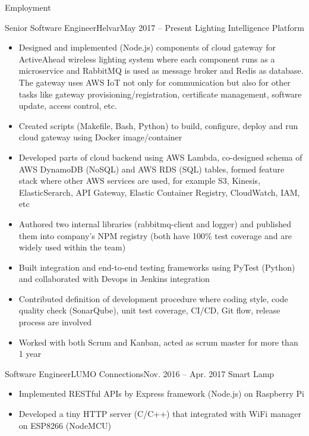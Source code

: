 \documentclass[print]{mcdowellcv}
\begin{document}
	\begin{cvsection}{Employment}
		\begin{cvsubsection}{Senior Software Engineer}{Helvar}{May 2017 -- Present}
			Lighting Intelligence Platform
			\begin{itemize}
			    \item Designed and implemented (Node.js) components of cloud gateway for ActiveAhead wireless lighting system where each component runs as a microservice and RabbitMQ is used as message broker and Redis as database. The gateway uses AWS IoT not only for communication but also for other tasks like gateway provisioning/registration, certificate management, software update, access control, etc.
				\item Created scripts (Makefile, Bash, Python) to build, configure, deploy and run cloud gateway using Docker image/container
				\item Developed parts of cloud backend using AWS Lambda, co-designed schema of AWS DynamoDB (NoSQL) and AWS RDS (SQL) tables, formed feature stack where other AWS services are used, for example S3, Kinesis, ElasticSerarch, API Gateway, Elastic Container Registry, CloudWatch, IAM, etc
				\item Authored two internal libraries (rabbitmq-client and logger) and published them into company's NPM registry (both have 100\% test coverage and are widely used within the team)
				\item Built integration and end-to-end testing frameworks using PyTest (Python) and collaborated with Devops in Jenkins integration
				\item Contributed definition of development procedure where coding style, code quality check (SonarQube), unit test coverage, CI/CD, Git flow, release process are involved
				\item Worked with both Scrum and Kanban, acted as scrum master for more than 1 year
			\end{itemize}
		\end{cvsubsection}
		
		\begin{cvsubsection}{Software Engineer}{LUMO Connections}{Nov. 2016 -- Apr. 2017}	
			Smart Lamp
			\begin{itemize}
				\item Implemented RESTful APIs by Express framework (Node.js) on Raspberry Pi
				\item Developed a tiny HTTP server (C/C++) that integrated with WiFi manager on ESP8266 (NodeMCU)
			\end{itemize}
		\end{cvsubsection}
			

\end{cvsection}
\end{document}
